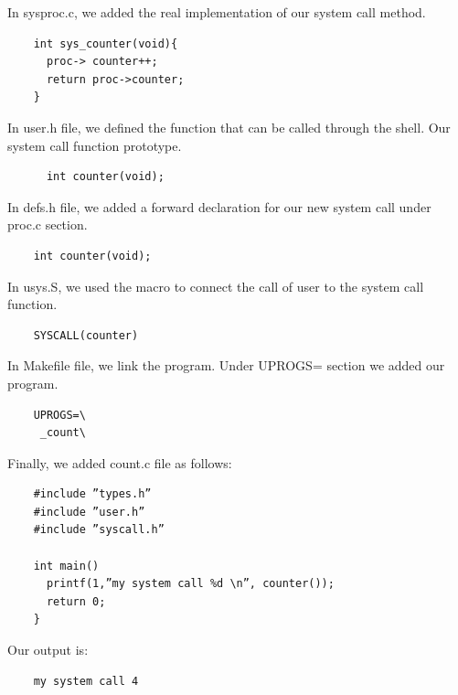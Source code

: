 \documentclass[10pt]{scrartcl}
\begin{document}
In sysproc.c, we added the real implementation of our system call method.
 \begin{verbatim}
    int sys_counter(void){
      proc-> counter++;
      return proc->counter;
    }
\end{verbatim}

In user.h file, we defined the function that can be called through the shell.  Our system call function prototype.
 \begin{verbatim}
      int counter(void);
\end{verbatim}

In defs.h file, we added a forward declaration for our new system call under proc.c section.
 \begin{verbatim}
    int counter(void);
\end{verbatim}

In usys.S, we used the macro to connect the call of user to the system call function.
 \begin{verbatim}
    SYSCALL(counter)
\end{verbatim}

In Makefile file, we link the program. Under UPROGS= section we added our program.
 \begin{verbatim}
    UPROGS=\
     _count\
\end{verbatim}

Finally, we added count.c file as follows:
 \begin{verbatim}
    #include ”types.h”
    #include ”user.h”
    #include ”syscall.h”
    
    int main()
      printf(1,”my system call %d \n”, counter());
      return 0;
    }
\end{verbatim}

Our output is:

 \begin{verbatim}
    my system call 4
\end{verbatim}
\end{document}
